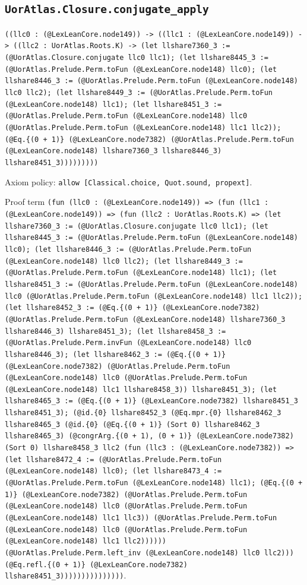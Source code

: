 \documentclass[11pt]{article}
\begin{document}
\subsection*{\texttt{UorAtlas.Closure.conjugate\_apply}}
\noindent\texttt{((llc0 : (@LexLeanCore.node149)) -> ((llc1 : (@LexLeanCore.node149)) -> ((llc2 : UorAtlas.Roots.K) -> (let llshare7360\_3 := (@UorAtlas.Closure.conjugate llc0 llc1); (let llshare8445\_3 := (@UorAtlas.Prelude.Perm.toFun (@LexLeanCore.node148) llc0); (let llshare8446\_3 := (@UorAtlas.Prelude.Perm.toFun (@LexLeanCore.node148) llc0 llc2); (let llshare8449\_3 := (@UorAtlas.Prelude.Perm.toFun (@LexLeanCore.node148) llc1); (let llshare8451\_3 := (@UorAtlas.Prelude.Perm.toFun (@LexLeanCore.node148) llc0 (@UorAtlas.Prelude.Perm.toFun (@LexLeanCore.node148) llc1 llc2)); (@Eq.\{(0 + 1)\} (@LexLeanCore.node7382) (@UorAtlas.Prelude.Perm.toFun (@LexLeanCore.node148) llshare7360\_3 llshare8446\_3) llshare8451\_3)))))))))}\par
\noindent Axiom policy: \texttt{allow [Classical.choice, Quot.sound, propext]}.\par
\noindent Proof term \texttt{(fun (llc0 : (@LexLeanCore.node149)) => (fun (llc1 : (@LexLeanCore.node149)) => (fun (llc2 : UorAtlas.Roots.K) => (let llshare7360\_3 := (@UorAtlas.Closure.conjugate llc0 llc1); (let llshare8445\_3 := (@UorAtlas.Prelude.Perm.toFun (@LexLeanCore.node148) llc0); (let llshare8446\_3 := (@UorAtlas.Prelude.Perm.toFun (@LexLeanCore.node148) llc0 llc2); (let llshare8449\_3 := (@UorAtlas.Prelude.Perm.toFun (@LexLeanCore.node148) llc1); (let llshare8451\_3 := (@UorAtlas.Prelude.Perm.toFun (@LexLeanCore.node148) llc0 (@UorAtlas.Prelude.Perm.toFun (@LexLeanCore.node148) llc1 llc2)); (let llshare8452\_3 := (@Eq.\{(0 + 1)\} (@LexLeanCore.node7382) (@UorAtlas.Prelude.Perm.toFun (@LexLeanCore.node148) llshare7360\_3 llshare8446\_3) llshare8451\_3); (let llshare8458\_3 := (@UorAtlas.Prelude.Perm.invFun (@LexLeanCore.node148) llc0 llshare8446\_3); (let llshare8462\_3 := (@Eq.\{(0 + 1)\} (@LexLeanCore.node7382) (@UorAtlas.Prelude.Perm.toFun (@LexLeanCore.node148) llc0 (@UorAtlas.Prelude.Perm.toFun (@LexLeanCore.node148) llc1 llshare8458\_3)) llshare8451\_3); (let llshare8465\_3 := (@Eq.\{(0 + 1)\} (@LexLeanCore.node7382) llshare8451\_3 llshare8451\_3); (@id.\{0\} llshare8452\_3 (@Eq.mpr.\{0\} llshare8462\_3 llshare8465\_3 (@id.\{0\} (@Eq.\{(0 + 1)\} (Sort 0) llshare8462\_3 llshare8465\_3) (@congrArg.\{(0 + 1), (0 + 1)\} (@LexLeanCore.node7382) (Sort 0) llshare8458\_3 llc2 (fun (llc3 : (@LexLeanCore.node7382)) => (let llshare8472\_4 := (@UorAtlas.Prelude.Perm.toFun (@LexLeanCore.node148) llc0); (let llshare8473\_4 := (@UorAtlas.Prelude.Perm.toFun (@LexLeanCore.node148) llc1); (@Eq.\{(0 + 1)\} (@LexLeanCore.node7382) (@UorAtlas.Prelude.Perm.toFun (@LexLeanCore.node148) llc0 (@UorAtlas.Prelude.Perm.toFun (@LexLeanCore.node148) llc1 llc3)) (@UorAtlas.Prelude.Perm.toFun (@LexLeanCore.node148) llc0 (@UorAtlas.Prelude.Perm.toFun (@LexLeanCore.node148) llc1 llc2)))))) (@UorAtlas.Prelude.Perm.left\_inv (@LexLeanCore.node148) llc0 llc2))) (@Eq.refl.\{(0 + 1)\} (@LexLeanCore.node7382) llshare8451\_3)))))))))))))))}.\par
\end{document}

